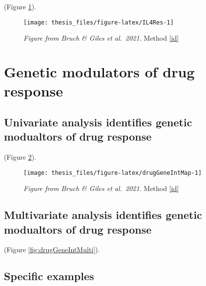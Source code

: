 \documentclass[11pt, a4paper, twosided]{book}
\begin{document}
(Figure \ref{fig:IL4Res}).


\begin{figure}

{\centering \texttt{[image: thesis\_files/figure-latex/IL4Res-1]} 

}

\caption{\emph{Figure from Bruch \& Giles et al.~2021.} Method \ref{id}}\label{fig:IL4Res}
\end{figure}
\hypertarget{genetic-modulators-of-drug-response}{%
\section{Genetic modulators of drug response}\label{genetic-modulators-of-drug-response}}

\hypertarget{univariate-analysis-identifies-genetic-modualtors-of-drug-response}{%
\subsection{Univariate analysis identifies genetic modualtors of drug response}\label{univariate-analysis-identifies-genetic-modualtors-of-drug-response}}

(Figure \ref{fig:drugGeneIntMap}).


\begin{figure}

{\centering \texttt{[image: thesis\_files/figure-latex/drugGeneIntMap-1]} 

}

\caption{\emph{Figure from Bruch \& Giles et al.~2021.} Method \ref{id}}\label{fig:drugGeneIntMap}
\end{figure}
\hypertarget{multivariate-analysis-identifies-genetic-modualtors-of-drug-response}{%
\subsection{Multivariate analysis identifies genetic modualtors of drug response}\label{multivariate-analysis-identifies-genetic-modualtors-of-drug-response}}

(Figure \ref{fig:drugGeneIntMulti}).



\hypertarget{specific-examples}{%
\subsection{Specific examples}\label{specific-examples}}
\end{document}
